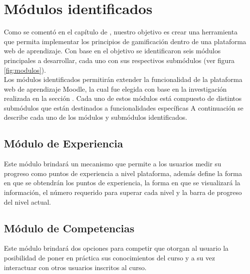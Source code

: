 
\section{Módulos identificados}
\label{analisis:modulos}

 Como se comentó en el capítulo de , nuestro
 objetivo es crear una herramienta que permita implementar los principios de
 gamificación dentro de una plataforma web de aprendizaje. Con base en el objetivo
 se identificaron seis módulos principales a desarrollar, cada uno con sus
 respectivos submódulos (ver figura \ref{fig:modulos}).\\

 \noindent
 Los módulos identificados permitirán extender la funcionalidad de la plataforma web
 de aprendizaje Moodle, la cual fue elegida con base en la investigación realizada en
 la sección . Cada uno de estos módulos está
 compuesto de distintos submódulos que están destinados a funcionalidades específicas
 A continuación se describe cada uno de los módulos y submódulos identificados.






\subsection*{Módulo de Experiencia}

 \noindent
 Este módulo brindará un mecanismo que permite a los usuarios medir su progreso
 como puntos de experiencia a nivel plataforma, además define la forma en que se
 obtendrán los puntos de experiencia, la forma en que se visualizará la información,
 el número requerido para superar cada nivel y la barra de progreso del nivel
 actual.

\subsection*{Módulo de Competencias}

 \noindent
 Este módulo brindará dos opciones para competir que otorgan al usuario
 la posibilidad de poner en práctica sus conocimientos del curso y a su vez
 interactuar con otros usuarios inscritos al curso.

